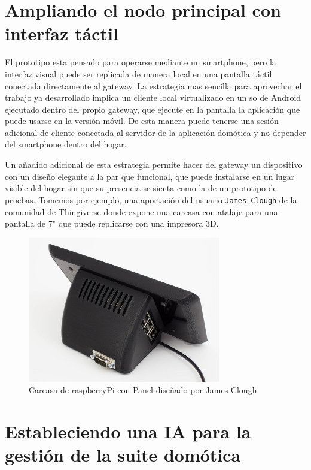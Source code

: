 \section{Ampliando el nodo principal con interfaz táctil}
\label{ch:Capitulo6.5}

El prototipo esta pensado para operarse mediante un smartphone, pero la interfaz visual puede ser replicada de manera local en una pantalla táctil conectada directamente al \gls{gateway}. La estrategia mas sencilla para aprovechar el trabajo ya desarrollado implica un cliente local virtualizado en un \gls{so} de Android ejecutado dentro del propio \gls{gateway}, que ejecute en la pantalla la aplicación que puede usarse en la versión móvil. De esta manera puede tenerse una sesión adicional de cliente conectada al servidor de la aplicación domótica y no depender del smartphone dentro del hogar.

\vspace{1cm}

Un añadido adicional de esta estrategia permite hacer del \gls{gateway} un dispositivo con un diseño elegante a la par que funcional, que puede instalarse en un lugar visible del hogar sin que su presencia se sienta como la de un prototipo de pruebas. Tomemos por ejemplo, una aportación del usuario \verb|James Clough| de la comunidad de Thingiverse\cite{raspberry_case_7} donde expone una carcasa con atalaje para una pantalla de 7" que puede replicarse con una impresora 3D.

\begin{figure}[hbt!]
\centering
\includegraphics[height=2.5in]{figures/raspberrypicase7_preview_featured.jpg}
\caption[Carcasa de raspberryPi con Panel]{Carcasa de raspberryPi con Panel diseñado por James Clough\footnotemark}
\end{figure}


\section{Estableciendo una IA para la gestión de la suite domótica}
\label{ch:Capitulo6.6}

